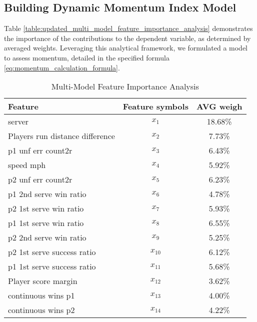 \documentclass{mcmthesis}
\begin{document}
\subsection{Building Dynamic Momentum Index Model}
Table \ref{table:updated_multi_model_feature_importance_analysis} demonstrates the importance of the contributions to the dependent variable, as determined by averaged weights. Leveraging this analytical framework, we formulated a model to assess momentum, detailed in the specified formula \ref{eq:momentum_calculation_formula}.
\begin{table}[h!]
    \centering
    \caption{Multi-Model Feature Importance Analysis}
    \begin{tabular}{lcc}
        \hline
        \textbf{Feature}                & \textbf{Feature symbols} & \textbf{AVG weigh} \\
        \hline
        server                          & \(x_1\)                  & 18.68\%            \\
        Players run distance difference & \(x_2\)                  & 7.73\%             \\
        p1 unf err count2r              & \(x_3\)                  & 6.43\%             \\
        speed mph                       & \(x_4\)                  & 5.92\%             \\
        p2 unf err count2r              & \(x_5\)                  & 6.23\%             \\
        p1 2nd serve win ratio          & \(x_6\)                  & 4.78\%             \\
        p2 1st serve win ratio          & \(x_7\)                  & 5.93\%             \\
        p1 1st serve win ratio          & \(x_8\)                  & 6.55\%             \\
        p2 2nd serve win ratio          & \(x_9\)                  & 5.25\%             \\
        p2 1st serve success ratio      & \(x_{10}\)               & 6.12\%             \\
        p1 1st serve success ratio      & \(x_{11}\)               & 5.68\%             \\
        Player score margin             & \(x_{12}\)               & 3.62\%             \\
        continuous wins p1              & \(x_{13}\)               & 4.00\%             \\
        continuous wins p2              & \(x_{14}\)               & 4.22\%             \\

\end{tabular}
\end{table}
\end{document}
